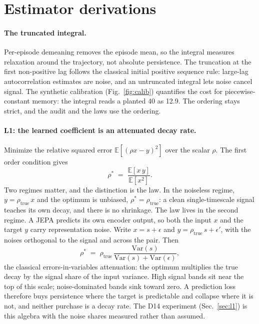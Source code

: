 \documentclass[11pt]{article}
\begin{document}
\section{Estimator derivations}
\label{app:estimator}

\paragraph{The truncated integral.}
Per-episode demeaning removes the episode mean, so the integral measures relaxation around the trajectory, not absolute persistence.
The truncation at the first non-positive lag follows the classical initial positive sequence rule: large-lag autocorrelation estimates are noise, and an untruncated integral lets noise cancel signal.
The synthetic calibration (Fig.~\ref{fig:calib}) quantifies the cost for piecewise-constant memory: the integral reads a planted 40 as 12.9.
The ordering stays strict, and the audit and the laws use the ordering.

\paragraph{L1: the learned coefficient is an attenuated decay rate.}
Minimize the relative squared error $\mathbb{E}[(\rho x - y)^2]$ over the scalar $\rho$.
The first order condition gives
\begin{equation}
\rho^* \;=\; \frac{\mathbb{E}[x\,y]}{\mathbb{E}[x^2]}.
\end{equation}
Two regimes matter, and the distinction is the law.
In the noiseless regime, $y = \rho_{\mathrm{true}}\,x$ and the optimum is unbiased, $\rho^* = \rho_{\mathrm{true}}$: a clean single-timescale signal teaches its own decay, and there is no shrinkage.
The law lives in the second regime.
A JEPA predicts its own encoder output, so both the input $x$ and the target $y$ carry representation noise.
Write $x = s + \epsilon$ and $y = \rho_{\mathrm{true}}\,s + \epsilon'$, with the noises orthogonal to the signal and across the pair.
Then
\begin{equation}
\rho^* \;=\; \rho_{\mathrm{true}}\,\frac{\mathrm{Var}(s)}{\mathrm{Var}(s) + \mathrm{Var}(\epsilon)},
\end{equation}
the classical errors-in-variables attenuation: the optimum multiplies the true decay by the signal share of the input variance.
High signal bands sit near the top of this scale; noise-dominated bands sink toward zero.
A prediction loss therefore buys persistence where the target is predictable and collapse where it is not, and neither purchase is a decay rate.
The D14 experiment (Sec.~\ref{sec:l1}) is this algebra with the noise shares measured rather than assumed.
\end{document}
